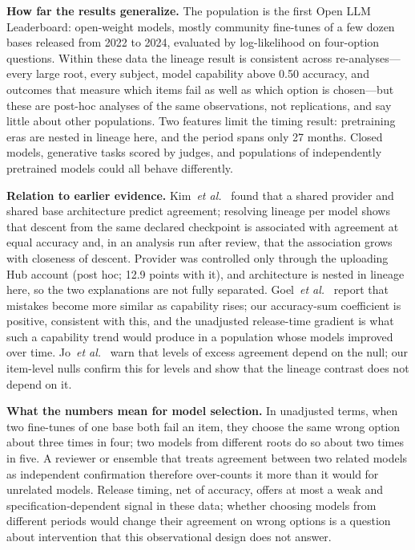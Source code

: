 \documentclass{ieeeaccess}
\theoremstyle{definition}
\theoremstyle{plain}
\begin{document}
\textbf{How far the results generalize.} The population is the first Open LLM Leaderboard: open-weight models, mostly community fine-tunes of a few dozen bases released from 2022 to 2024, evaluated by log-likelihood on four-option questions. Within these data the lineage result is consistent across re-analyses---every large root, every subject, model capability above 0.50 accuracy, and outcomes that measure which items fail as well as which option is chosen---but these are post-hoc analyses of the same observations, not replications, and say little about other populations. Two features limit the timing result: pretraining eras are nested in lineage here, and the period spans only 27 months. Closed models, generative tasks scored by judges, and populations of independently pretrained models could all behave differently.

\textbf{Relation to earlier evidence.} Kim~\textit{et al.}~\cite{kim2025} found that a shared provider and shared base architecture predict agreement; resolving lineage per model shows that descent from the same declared checkpoint is associated with agreement at equal accuracy and, in an analysis run after review, that the association grows with closeness of descent. Provider was controlled only through the uploading Hub account (post hoc; 12.9 points with it), and architecture is nested in lineage here, so the two explanations are not fully separated. Goel~\textit{et al.}~\cite{goel2025} report that mistakes become more similar as capability rises; our accuracy-sum coefficient is positive, consistent with this, and the unadjusted release-time gradient is what such a capability trend would produce in a population whose models improved over time. Jo~\textit{et al.}~\cite{jo2026} warn that levels of excess agreement depend on the null; our item-level nulls confirm this for levels and show that the lineage contrast does not depend on it.

\textbf{What the numbers mean for model selection.} In unadjusted terms, when two fine-tunes of one base both fail an item, they choose the same wrong option about three times in four; two models from different roots do so about two times in five. A reviewer or ensemble that treats agreement between two related models as independent confirmation therefore over-counts it more than it would for unrelated models. Release timing, net of accuracy, offers at most a weak and specification-dependent signal in these data; whether choosing models from different periods would change their agreement on wrong options is a question about intervention that this observational design does not answer.
\end{document}
